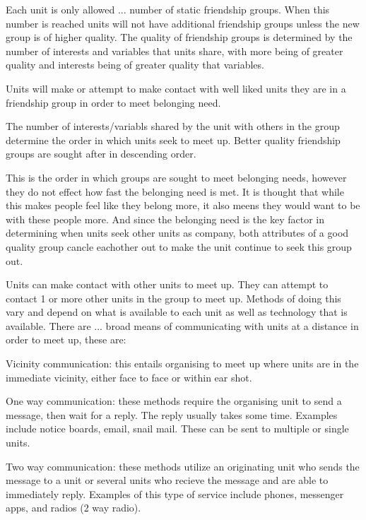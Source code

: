 Each unit is only allowed ... number of static friendship groups. When this number is reached units will not have additional friendship groups unless the new group is of higher quality. The quality of friendship groups is determined by the number of interests and variables that units share, with more being of greater quality and interests being of greater quality that variables.

Units will make or attempt to make contact with well liked units they are in a friendship group in order to meet belonging need. 

The number of interests/variabls shared by the unit with others in the group determine the order in which units seek to meet up. Better quality friendship groups are sought after in descending order.

This is the order in which groups are sought to meet belonging needs, however they do not effect how fast the belonging need is met. It is thought that while this makes people feel like they belong more, it also meens they would want to be with these people more. And since the belonging need is the key factor in determining when units seek other units as company, both attributes of a good quality group cancle eachother out to make the unit continue to seek this group out. 


Units can make contact with other units to meet up. They can attempt to contact 1 or more other units in the group to meet up. Methods of doing this vary and depend on what is available to each unit as well as technology that is available. There are ... broad means of communicating with units at a distance in order to meet up, these are:

Vicinity communication: this entails organising to meet up where units are in the immediate vicinity, either face to face or within ear shot.

One way communication: these methods require the organising unit to send a message, then wait for a reply. The reply usually takes some time. Examples include notice boards, email, snail mail. These can be sent to multiple or single units.   

Two way communication: these methods utilize an originating unit who sends the message to a unit or several units who recieve the message and are able to immediately reply. Examples of this type of service include phones, messenger apps, and radios (2 way radio). 

